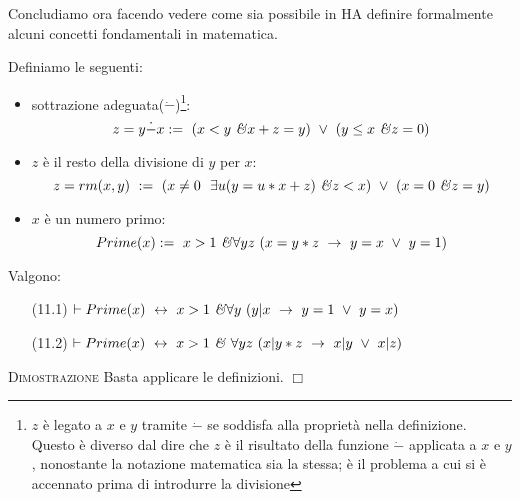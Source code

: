 \newpage Concludiamo ora facendo vedere come sia possibile in HA definire formalmente alcuni concetti fondamentali in matematica.

\begin{defi}
Definiamo le seguenti:
\vspace{.1cm}
\begin{itemize}
\item sottrazione adeguata($\dot{-}$)\footnote{$z$ \`e legato a $x$ e $y$ tramite $\dot{-}$ se soddisfa alla propriet\`a nella definizione. Questo \`e diverso dal dire che $z$ \`e il risultato della funzione $\dot{-}$ applicata a $x$ e $y$, nonostante la notazione matematica sia la stessa; \`e il problema a cui si \`e accennato prima di introdurre la divisione}: {\footnotesize{$$z=y\dot{-} x:=\ (x<y\ \mbox{\emph{\&}} x+z=y)\ \vee\ (y\leq x\ \mbox{\emph{\&}} z=0)$$}}
\vspace{.1cm}
\item $z$ \`e il resto della divisione di $y$ per $x$:{\footnotesize{ $$z=rm(x,y)\ :=\ (x\neq 0\ \ \exists u(y=u*x+z)\ \mbox{\emph{\&}} z<x)\ \vee\ (x=0\ \mbox{\emph{\&}} z=y)$$}}
\vspace{.1cm}
\item $x$ \`e un numero primo: {\footnotesize{$$Prime(x):=\ x>1\ \mbox{\emph{\&}} \forall yz\  (x=y*z\ \to\ y=x\ \vee\ y=1)$$}}
\end{itemize}
\end{defi}

\vspace{.2cm}
\begin{prop} Valgono:
\vspace{.2cm}
\begin{enumerate}
	\item[(11.1)] $\vdash Prime(x)\ \leftrightarrow\ x>1\ \mbox{\emph{\&}} \forall y\ (y|x\ \to\ y=1\ \vee\ y=x)$
	\vspace{.2cm}
	\item[(11.2)] $\vdash Prime(x)\ \leftrightarrow\ x>1\ \mbox{\emph{\&}}\ \forall yz\ (x|y*z\ \to\ x|y\ \vee\ x|z)$
\end{enumerate}
\end{prop}
\vspace{.5cm}
\textsc{Dimostrazione}
Basta applicare le definizioni.
 $\Box$\\
